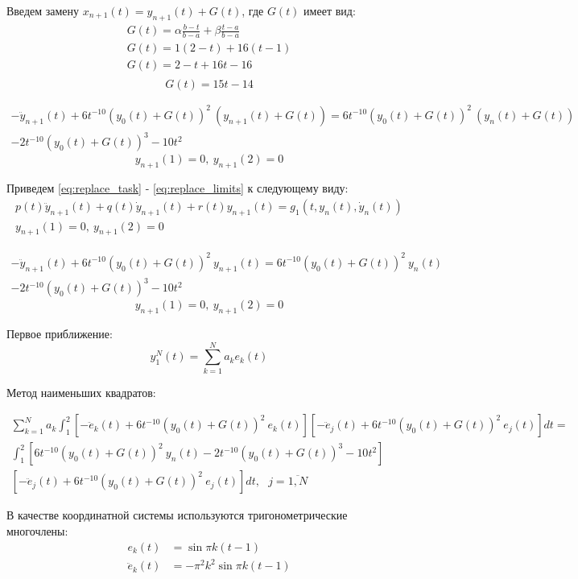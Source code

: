 \documentclass[12pt]{article}
\begin{document}
Введем замену $x_{n+1}(t) = y_{n+1}(t) + G(t)$, где $G(t)$ имеет вид:
\begin{gather*}
	G(t) = \alpha \frac{b-t}{b-a} + \beta \frac{t-a}{b-a} \\
	G(t) = 1 (2-t) + 16 (t-1) \\
	G(t) = 2-t + 16t-16 \\
\end{gather*}
\begin{equation}
	G(t) = 15t - 14
\end{equation}

\begin{multline} \label{eq:replace_task}
    -\ddot{y}_{n+1}(t) + 6t^{-10}(y_0(t) + G(t))^2\ (y_{n+1}(t) + G(t)) =
     6t^{-10}(y_0(t) + G(t))^2\ (y_n(t) + G(t)) \\
     - 2t^{-10}(y_0(t) + G(t))^3 - 10t^2
\end{multline}
\begin{equation} \label{eq:replace_limits}
    y_{n+1}(1)=0,\ y_{n+1}(2)=0
\end{equation}

Приведем \eqref{eq:replace_task} - \eqref{eq:replace_limits} к следующему виду:
\begin{gather}
    p(t)\ddot{y}_{n+1}(t) + q(t)\dot{y}_{n+1}(t) + r(t)y_{n+1}(t) = g_1(t, y_n(t), \dot{y}_n(t)) \\
    y_{n+1}(1) = 0,\ y_{n+1}(2) = 0
\end{gather}

\begin{multline}
    -\ddot{y}_{n+1}(t) + 6t^{-10}(y_0(t) + G(t))^2\ y_{n+1}(t) =
    6t^{-10}(y_0(t) + G(t))^2\ y_n(t) \\
    - 2t^{-10}(y_0(t) + G(t))^3 - 10t^2
\end{multline}
\begin{equation}
    y_{n+1}(1) = 0,\ y_{n+1}(2) = 0
\end{equation}

Первое приближение:
\begin{equation}
    y_1^N(t) = \sum_{k = 1}^{N}a_ke_k(t)
\end{equation}

Метод наименьших квадратов:

\newcommand{\gone}{\ensuremath{
    6t^{-10}(y_0(t)+G(t))^2\ y_n(t) - 2t^{-10}(y_0(t)+G(t))^3 - 10t^2
}}
\newcommand{\operator}[1]{\ensuremath{
    -\ddot{e}_#1(t) + 6t^{-10}(y_0(t) + G(t))^2\ e_#1(t)
}}

\begin{multline} \label{lsm}
    \sum_{k = 1}^{N}a_k
    \int_1^2 [\operator{k}][\operator{j}]dt = \\
    \int_1^2 [\gone] \\ [\operator{j}]dt,\ \ \
    j = \overline{1,N}
\end{multline}

В качестве координатной системы используются тригонометрические многочлены:
\begin{equation}
    \begin{split}
        e_k(t) &= \sin{\pi k (t - 1)} \\
        \ddot{e}_k(t)&= -\pi^2 k^2\sin{\pi k(t-1)}
    \end{split}
\end{equation}
\end{document}
